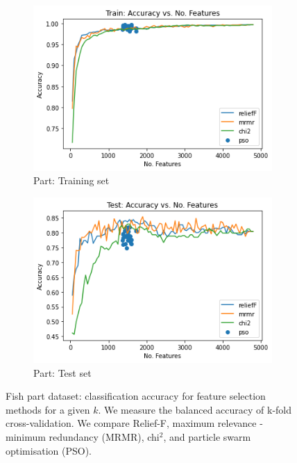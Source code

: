 \documentclass[runningheads]{llncs}
\begin{document}
\begin{figure}[htb]
  \centering
  \begin{subfigure}[b]{.55\linewidth}
    \includegraphics[width=\linewidth]{accuracy-features-part-train.png}
    \caption{Part: Training set}\label{fig:accuracy-features-part-train}
  \end{subfigure}
  \begin{subfigure}[b]{.55\linewidth}
    \includegraphics[width=\linewidth]{accuracy-features-part-test.png}
    \caption{Part: Test set}\label{fig:accuracy-features-part-test}
  \end{subfigure}
  \caption[Two numerical solutions]{
    Fish part dataset: classification accuracy for feature selection methods for a given $k$.
    We measure the balanced accuracy of k-fold cross-validation.
    We compare Relief-F, maximum relevance - minimum redundancy (MRMR), chi$^2$, and particle swarm optimisation (PSO).
    }
  \label{fig:accuracy-features-part-train}
\end{figure}
\end{document}
